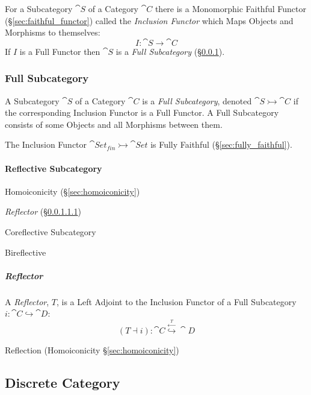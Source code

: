 For a Subcategory $\cat{S}$ of a Category $\cat{C}$ there is a
Monomorphic Faithful Functor (\S\ref{sec:faithful_functor}) called the
\emph{Inclusion Functor} which Maps Objects and Morphisms to
themselves:
\[
  I : \cat{S} \rightarrow \cat{C}
\]
If $I$ is a Full Functor then $\cat{S}$ is a \emph{Full
  Subcategory} (\S\ref{sec:full_subcategory}).



\subsubsection{Full Subcategory}\label{sec:full_subcategory}

A Subcategory $\cat{S}$ of a Category $\cat{C}$ is a \emph{Full
  Subcategory}, denoted $\cat{S} \rightarrowtail \cat{C}$ if the
corresponding Inclusion Functor is a Full Functor. A Full Subcategory
consists of some Objects and all Morphisms between them.

The Inclusion Functor $\cat{Set}_{fin} \rightarrowtail
\cat{Set}$ is Fully Faithful (\S\ref{sec:fully_faithful}).



\paragraph{Reflective Subcategory}\label{sec:reflective_subcategory}\hfill

Homoiconicity (\S\ref{sec:homoiconicity})

\emph{Reflector} (\S\ref{sec:reflector})

Coreflective Subcategory

Bireflective



\subparagraph{Reflector}\label{sec:reflector}\hfill


A \emph{Reflector}, $T$, is a Left Adjoint to the Inclusion Functor of
a Full Subcategory $i : \cat{C} \hookrightarrow \cat{D}$:
\[
  (T \dashv i) :
  \cat{C} \stackrel{\xleftarrow{T}}{\hookrightarrow} \cat{D}
\]

Reflection (Homoiconicity \S\ref{sec:homoiconicity})



\subsection{Discrete Category}\label{sec:discrete_category}


